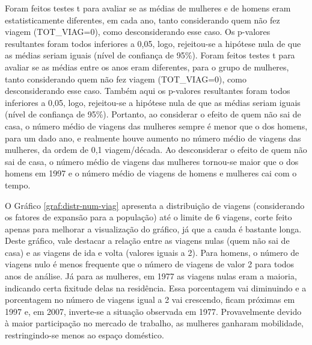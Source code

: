 Foram feitos testes t para avaliar se as médias de mulheres e de homens eram estatisticamente diferentes, em cada ano, tanto considerando quem não fez viagem \mbox{(TOT_VIAG=0)}, como desconsiderando esse caso. Os p-valores resultantes foram todos inferiores a 0,05, logo, rejeitou-se a hipótese nula de que as médias seriam iguais (nível de confiança de 95\%).
Foram feitos testes t para avaliar se as médias entre os anos eram diferentes, para o grupo de mulheres, tanto considerando quem não fez viagem \mbox{(TOT_VIAG=0)}, como desconsiderando esse caso. Também aqui os p-valores resultantes foram todos inferiores a 0,05, logo, rejeitou-se a hipótese nula de que as médias seriam iguais (nível de confiança de 95\%). 
Portanto, ao considerar o efeito de quem não sai de casa, o número médio de viagens das mulheres sempre é menor que o dos homens, para um dado ano, e realmente houve aumento no número médio de viagens das mulheres, da ordem de 0,1 viagem/década.
Ao desconsiderar o efeito de quem não sai de casa, o número médio de viagens das mulheres tornou-se maior que o dos homens em 1997 e o número médio de viagens de homens e mulheres cai com o tempo.

O Gráfico \ref{graf:distr-num-viag} apresenta a distribuição de viagens (considerando os fatores de expansão para a população) até o limite de 6 viagens, corte feito apenas para melhorar a visualização do gráfico, já que a cauda é bastante longa. 
Deste gráfico, vale destacar a relação entre as viagens nulas (quem não sai de casa) e as viagens de ida e volta (valores iguais a 2). Para homens, o número de viagens nulo é menos frequente que o número de viagens de valor 2 para todos anos de análise. Já para as mulheres, em 1977 as viagens nulas eram a maioria, indicando certa fixitude delas na residência. Essa porcentagem vai diminuindo e a porcentagem no número de viagens igual a 2 vai crescendo, ficam próximas em 1997 e, em 2007, inverte-se a situação observada em 1977.
Provavelmente devido à maior participação no mercado de trabalho, as mulheres ganharam mobilidade, restringindo-se menos ao espaço doméstico.

